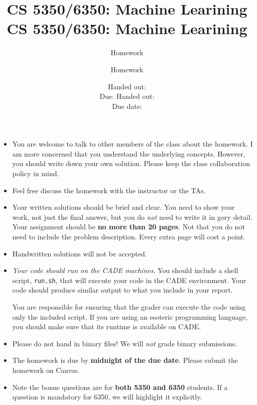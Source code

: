\documentclass[12pt, fullpage,letterpaper]{article}
\title{CS 5350/6350: Machine Learining \semester}
\author{Homework \assignmentId}
\date{Handed out: \releaseDate\\
	Due: \dueDate}
\title{CS 5350/6350: Machine Learining \semester}
\author{Homework \assignmentId}
\date{Handed out: \releaseDate\\
  Due date: \dueDate}
\begin{document}
\maketitle


{\footnotesize
	\begin{itemize}
		\item You are welcome to talk to other members of the class about
		the homework. I am more concerned that you understand the
		underlying concepts. However, you should write down your own
		solution. Please keep the class collaboration policy in mind.
		
		\item Feel free discuss the homework with the instructor or the TAs.
		
		\item Your written solutions should be brief and clear. You need to
		show your work, not just the final answer, but you do \emph{not}
		need to write it in gory detail. Your assignment should be {\bf no
			more than 20 pages}. Not that you do not need to include the problem description. Every extra page will cost a point.
		
		\item Handwritten solutions will not be accepted.
		
		
		\item {\em Your code should run on the CADE machines}. You should
		include a shell script, {\tt run.sh}, that will execute your code
		in the CADE environment. Your code should produce similar output
		to what you include in your report.
		
		You are responsible for ensuring that the grader can execute the
		code using only the included script. If you are using an
		esoteric programming language, you should make sure that its
		runtime is available on CADE.
		
		\item Please do not hand in binary files! We will {\em not} grade
		binary submissions.
		
		\item The homework is due by \textbf{midnight of the due date}. Please submit
		the homework on Canvas.
		
		\item Note the bonus questions are for \textbf{both 5350 and 6350} students. If a question is mandatory for 6350, we will highlight it explicitly. 
		
	\end{itemize}
}
\end{document}
